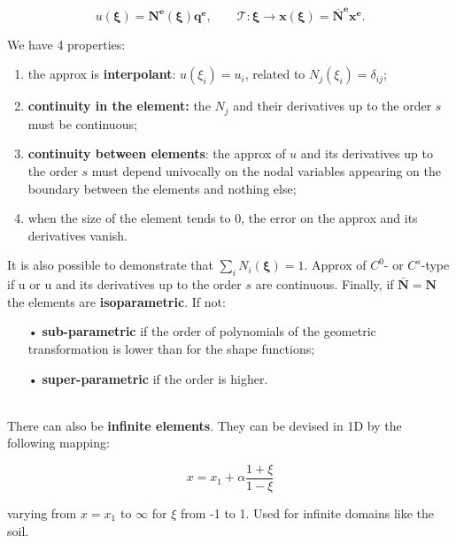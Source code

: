 	\begin{equation}
	u(\bm{\xi}) = \bm{N^e(\xi) q^e}, \qquad \mathcal{T}: \bm{\xi} \rightarrow \bm{x(\xi)} = \bm{\bar{N}^ex^e}.
	\end{equation}
	
	We have 4 properties:
	
	\begin{enumerate}
	\item the approx is \textbf{interpolant}: $u(\xi _i) = u_i$, related to $N_j (\xi _i) = \delta _{ij}$;
	
	\item \textbf{continuity in the element:} the $N_j$ and their derivatives up to the order $s$ must be continuous;
	
	\item \textbf{continuity between elements}: the approx of $u$ and its derivatives up to the order $s$ must depend univocally on the nodal variables appearing on the boundary between the elements and nothing else;
	
	\item when the size of the element tends to 0, the error on the approx and its derivatives vanish. 
	\end{enumerate}
	
	It is also possible to demonstrate that $\sum_i N_i(\bm{\xi}) = 1$. Approx of $C^0$- or $C^s$-type if u or u and its derivatives up to the order $s$ are continuous. Finally, if $\bm{\bar{N} = N}$ the elements are \textbf{isoparametric}. If not:
	
	\begin{itemize}
	\item[•] \textbf{sub-parametric} if the order of polynomials of the geometric transformation is lower than for the shape functions;
	
	\item[•] \textbf{super-parametric} if the order is higher. 
	\end{itemize}
	\ \\
	
	There can also be \textbf{infinite elements}. They can be devised in 1D by the following mapping: 
	
	\begin{equation}
	x = x_1 + \alpha \frac{1+\xi}{1-\xi}
	\end{equation}
	
	varying from $x=x_1$ to $\infty$ for $\xi$ from -1 to 1. Used for infinite domains like the soil. 
	
